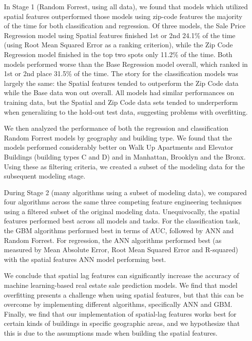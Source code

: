 \documentclass[12pt,]{article}
\begin{document}
In Stage 1 (Random Forrest, using all data), we found that models which
utilized spatial features outperformed those models using zip-code
features the majority of the time for both classification and
regression. Of three models, the Sale Price Regression model using
Spatial features finished 1st or 2nd 24.1\% of the time (using Root Mean
Squared Error as a ranking criterion), while the Zip Code Regression
model finished in the top two spots only 11.2\% of the time. Both models
performed worse than the Base Regression model overall, which ranked in
1st or 2nd place 31.5\% of the time. The story for the classification
models was largely the same: the Spatial features tended to outperform
the Zip Code data while the Base data won out overall. All models had
similar performances on training data, but the Spatial and Zip Code data
sets tended to underperform when generalizing to the hold-out test data,
suggesting problems with overfitting.

We then analyzed the performance of both the regression and
classification Random Forrest models by geography and building type. We
found that the models performed considerably better on Walk Up
Apartments and Elevator Buildings (building types C and D) and in
Manhattan, Brooklyn and the Bronx. Using these as filtering criteria, we
created a subset of the modeling data for the subsequent modeling stage.

During Stage 2 (many algorithms using a subset of modeling data), we
compared four algorithms across the same three competing feature
engineering techniques using a filtered subset of the original modeling
data. Unequivocally, the spatial features performed best across all
models and tasks. For the classification task, the GBM algorithms
performed best in terms of AUC, followed by ANN and Random Forrest. For
regression, the ANN algorithms performed best (as measured by Mean
Absolute Error, Root Mean Squared Error and R-squared) with the spatial
features ANN model performing best.

We conclude that spatial lag features can significantly increase the
accuracy of machine learning-based real estate sale prediction models.
We find that model overfitting presents a challenge when using spatial
features, but that this can be overcome by implementing different
algorithms, specifically ANN and GBM. Finally, we find that our
implementation of spatial-lag features works best for certain kinds of
buildings in specific geographic areas, and we hypothesize that this is
due to the assumptions made when building the spatial features.
\end{document}
